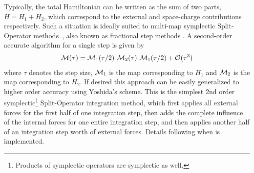 Typically, the total Hamiltonian can be written as the sum of two parts, $H = H_{1} + H_{2}$,
which correspond to the external and space-charge contributions respectively.
Such a situation is ideally suited to multi-map
symplectic Split-Operator methods~\cite{forestall}, also known as fractional step methods \cite{SanzSerna}.
A second-order accurate algorithm for a single step is given by
\begin{equation} \label{eq:splitOper1}
{\cal M}(\tau)={\cal M}_1(\tau/2)~{\cal M}_2(\tau)~{\cal M}_1(\tau/2) + \mathcal{O}(\tau^3)
\end{equation}
where $\tau$ denotes the step size, ${\cal M}_1$ is the map corresponding
to $H_{1}$  and ${\cal M}_2$ is the map corresponding to $H_{2}$.
If desired this approach can be
easily generalized to higher order accuracy using Yoshida's
scheme. %
This is the simplest 2nd order symplectic\footnote{Products of symplectic operators are symplectic as well.} Split-Operator integration method, which first applies all external forces for the first half of one integration step, then adds the complete influence of the internal forces for one entire integration step, and then applies another half of an integration step worth of external forces.
Details following when \opalmap is implemented.









